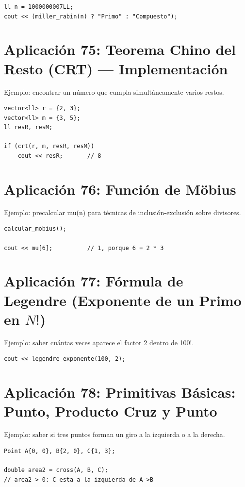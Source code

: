 \documentclass[10pt,twocolumn,letterpaper]{report}
\begin{document}
\begin{lstlisting}
ll n = 1000000007LL;
cout << (miller_rabin(n) ? "Primo" : "Compuesto");
\end{lstlisting}

\section{Aplicación 75: Teorema Chino del Resto (CRT) --- Implementación}
Ejemplo: encontrar un número que cumpla simultáneamente varios restos.

\begin{lstlisting}
vector<ll> r = {2, 3};
vector<ll> m = {3, 5};
ll resR, resM;

if (crt(r, m, resR, resM))
    cout << resR;       // 8
\end{lstlisting}

\section{Aplicación 76: Función de Möbius}
Ejemplo: precalcular mu(n) para técnicas de inclusión-exclusión sobre divisores.

\begin{lstlisting}
calcular_mobius();

cout << mu[6];          // 1, porque 6 = 2 * 3
\end{lstlisting}

\section{Aplicación 77: Fórmula de Legendre (Exponente de un Primo en $N!$)}
Ejemplo: saber cuántas veces aparece el factor 2 dentro de 100!.

\begin{lstlisting}
cout << legendre_exponente(100, 2);
\end{lstlisting}

\section{Aplicación 78: Primitivas Básicas: Punto, Producto Cruz y Punto}
Ejemplo: saber si tres puntos forman un giro a la izquierda o a la derecha.

\begin{lstlisting}
Point A{0, 0}, B{2, 0}, C{1, 3};

double area2 = cross(A, B, C);
// area2 > 0: C esta a la izquierda de A->B
\end{lstlisting}
\end{document}
